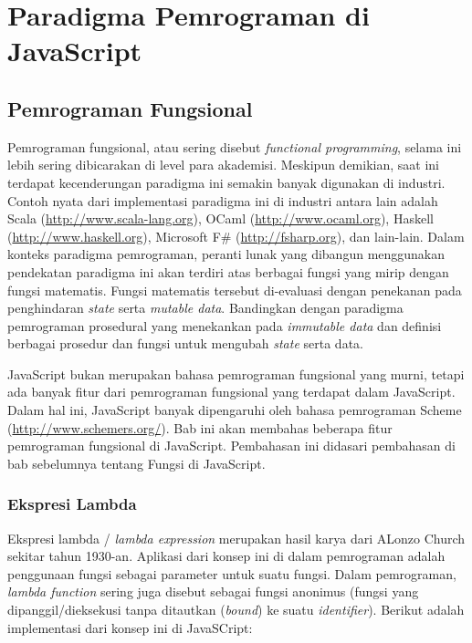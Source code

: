 \chapter{Paradigma Pemrograman di JavaScript}

\section{Pemrograman Fungsional}

Pemrograman fungsional, atau sering disebut \textit{functional programming}, selama ini lebih sering dibicarakan di level para akademisi. Meskipun demikian, saat ini terdapat kecenderungan paradigma ini semakin banyak digunakan di industri. Contoh nyata dari implementasi paradigma ini di industri antara lain adalah Scala (\url{http://www.scala-lang.org}), OCaml (\url{http://www.ocaml.org}), Haskell (\url{http://www.haskell.org}), Microsoft F\# (\url{http://fsharp.org}), dan lain-lain. Dalam konteks paradigma pemrograman, peranti lunak yang dibangun menggunakan pendekatan paradigma ini akan terdiri atas berbagai fungsi yang mirip dengan fungsi matematis. Fungsi matematis tersebut di-evaluasi dengan penekanan pada penghindaran \textit{state} serta \textit{mutable data}. Bandingkan dengan paradigma pemrograman prosedural yang menekankan pada \textit{immutable data} dan definisi berbagai prosedur dan fungsi untuk mengubah \textit{state} serta data.

JavaScript bukan merupakan bahasa pemrograman fungsional yang murni, tetapi ada banyak fitur dari pemrograman fungsional yang terdapat dalam JavaScript. Dalam hal ini, JavaScript banyak dipengaruhi oleh bahasa pemrograman Scheme (\url{http://www.schemers.org/}). Bab ini akan membahas beberapa fitur pemrograman fungsional di JavaScript. Pembahasan ini didasari pembahasan di bab sebelumnya tentang Fungsi di JavaScript.

\subsection{Ekspresi Lambda}

Ekspresi lambda / \textit{lambda expression} merupakan hasil karya dari ALonzo Church sekitar tahun 1930-an. Aplikasi dari konsep ini di dalam pemrograman adalah penggunaan fungsi sebagai parameter untuk suatu fungsi. Dalam pemrograman, \textit{lambda function} sering juga disebut sebagai fungsi anonimus (fungsi yang dipanggil/dieksekusi tanpa ditautkan (\textit{bound}) ke suatu \textit{identifier}). Berikut adalah implementasi dari konsep ini di JavaSCript:

